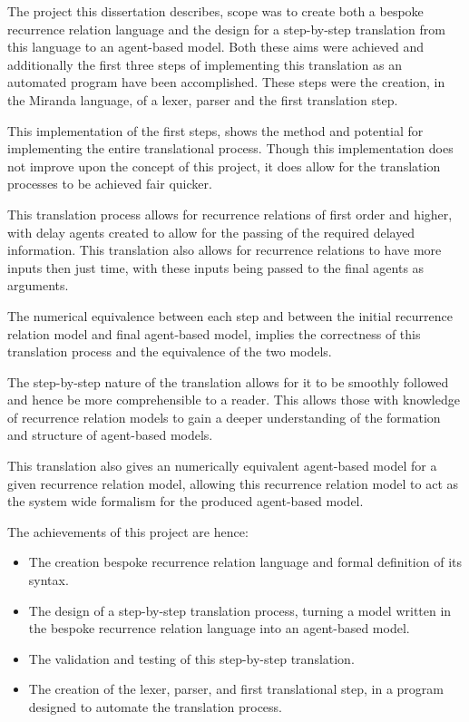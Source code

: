 \documentclass{article}
\begin{document}
The project this dissertation describes, scope was to create both a bespoke recurrence relation language and the design for a step-by-step translation from this language to an agent-based model. Both these aims were achieved and additionally the first three steps of implementing this translation as an automated program have been accomplished. These steps were the creation, in the Miranda language, of a lexer, parser and the first translation step. 

This implementation of the first steps, shows the method and potential for implementing the entire translational process. Though this implementation does not improve upon the concept of this project, it does allow for the translation processes to be achieved fair quicker.  

This translation process allows for recurrence relations of first order and higher, with delay agents created to allow for the passing of the required delayed information. This translation also allows for recurrence relations to have more inputs then just time, with these inputs being passed to the final agents as arguments.   

The numerical equivalence between each step and between the initial recurrence relation model and final agent-based model, implies the correctness of this translation process and the  equivalence of the two models.  

The step-by-step nature of the translation allows for it to be smoothly followed and hence be more comprehensible to a reader. This allows those with knowledge of recurrence relation models to gain a deeper understanding of the formation and structure of agent-based models. 

This translation also gives an numerically equivalent agent-based model for a given recurrence relation model, allowing this recurrence relation model to act as the system wide formalism for the produced agent-based model. 

The achievements of this project are hence:
\begin{itemize}
   \item The creation bespoke recurrence relation language and formal definition of its syntax.
   \item The design of a step-by-step translation process, turning a model written in the bespoke recurrence relation language into an agent-based model. 
   \item The validation and testing of this step-by-step translation.  
   \item The creation of the lexer, parser, and first translational step, in a program designed to automate the translation process. 
\end{itemize}
\end{document}
